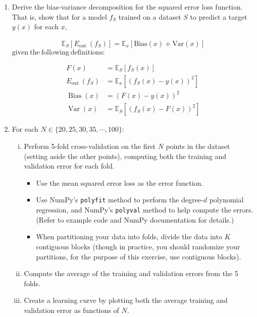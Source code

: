 \documentclass[
	12pt, %
]{fphw}
\begin{document}
\begin{problem}
	\begin{enumerate}
	\itemsep0.3em
	\parskip0.3em
	\item Derive the bias-variance decomposition for the squared error loss function. That is, show that for a model $f_S$ trained on a dataset $S$ to predict a target $y(x)$ for each $x$,

	$$
	\begin{aligned}\mathbb{E}_{S}\left[E_{\mathrm{out}}\:(f_{S})\right]=\mathbb{E}_{x}[\mathrm{Bias}(x)+\mathrm{Var}(x)]\end{aligned}
	$$
	$\mathrm{given~the~following~definitions: }$

$$
\begin{aligned}
F(x)& =\mathbb{E}_{S}\left[f_{S}(x)\right]  \\
E_{\mathrm{out}}\:(f_{S})& =\mathbb{E}_x\left[\left(f_S(x)-y(x)\right)^2\right]  \\
\operatorname{Bias}(x)& =(F(x)-y(x))^{2}  \\
\operatorname{Var}(x)& =\mathbb{E}_{S}\left[(f_{S}(x)-F(x))^{2}\right] 
\end{aligned}
$$

	\item For each \( N \in \{ 20, 25, 30, 35, \cdots, 100\} \):
	\begin{enumerate}[i.]
	  \item Perform 5-fold cross-validation on the first \( N \) points in the dataset (setting aside the other points), computing both the training and validation error for each fold.
		\begin{itemize}
		  \item Use the mean squared error loss as the error function.
		  \item Use NumPy's \texttt{polyfit} method to perform the degree-\( d \) polynomial regression, and NumPy's \texttt{polyval} method to help compute the errors. (Refer to example code and NumPy documentation for details.)
		  \item When partitioning your data into folds, divide the data into \( K \) contiguous blocks (though in practice, you should randomize your partitions, for the purpose of this exercise, use contiguous blocks).
		\end{itemize}
	  \item Compute the average of the training and validation errors from the 5 folds.
	  \item Create a learning curve by plotting both the average training and validation error as functions of \( N \).
	\end{enumerate}
  
	

\end{enumerate}
\end{problem}
\end{document}
